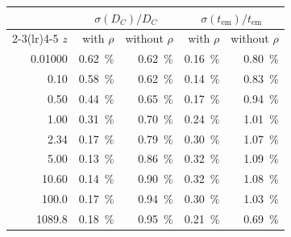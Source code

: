\begin{center}
\renewcommand{\arraystretch}{1.2}
\begin{tabular}{rrrrr}
\toprule
& \multicolumn{2}{c}{$\sigma(D_{C})/D_{C}$} & \multicolumn{2}{c}{$\sigma(t_{\text{em}})/t_{\text{em}}$} \\
\cmidrule(lr){2-3}\cmidrule(lr){4-5}
$z$ & with $\rho$ & without $\rho$ & with $\rho$ & without $\rho$ \\
\midrule
0.01000 & 0.62~\% & 0.62~\% & 0.16~\% & 0.80~\% \\
0.10 & 0.58~\% & 0.62~\% & 0.14~\% & 0.83~\% \\
0.50 & 0.44~\% & 0.65~\% & 0.17~\% & 0.94~\% \\
1.00 & 0.31~\% & 0.70~\% & 0.24~\% & 1.01~\% \\
2.34 & 0.17~\% & 0.79~\% & 0.30~\% & 1.07~\% \\
5.00 & 0.13~\% & 0.86~\% & 0.32~\% & 1.09~\% \\
10.60 & 0.14~\% & 0.90~\% & 0.32~\% & 1.08~\% \\
100.0 & 0.17~\% & 0.94~\% & 0.30~\% & 1.03~\% \\
1089.8 & 0.18~\% & 0.95~\% & 0.21~\% & 0.69~\% \\
\bottomrule
\end{tabular}
\end{center}
